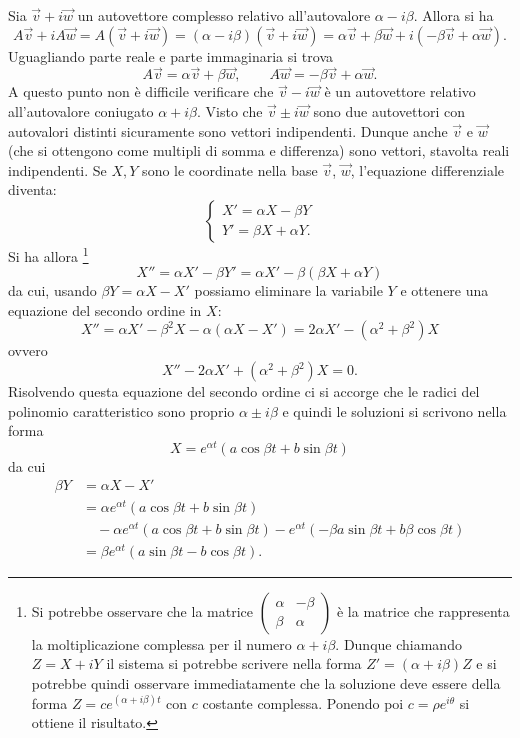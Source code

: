 Sia $\vec v + i \vec w$ un autovettore complesso relativo
all'autovalore $\alpha - i \beta$.
Allora si ha
\[
 A\vec v + i A \vec w
 = A(\vec v + i \vec w)
 = (\alpha - i \beta)(\vec v + i \vec w)
 = \alpha \vec v + \beta \vec w +i(-\beta \vec v + \alpha \vec w).
\]
Uguagliando parte reale e parte immaginaria si trova
\[
  A \vec v = \alpha \vec v + \beta \vec w,
  \qquad
  A \vec w = -\beta \vec v + \alpha \vec w.
\]
A questo punto non è difficile verificare che $\vec v - i \vec w$
è un autovettore relativo all'autovalore coniugato $\alpha + i\beta$.
Visto che $\vec v\pm i\vec w$ sono due autovettori con autovalori
distinti sicuramente sono vettori indipendenti.
Dunque anche $\vec v$ e $\vec w$
(che si ottengono come multipli di somma e differenza)
sono vettori, stavolta reali
indipendenti.
Se $X,Y$ sono le coordinate nella base $\vec v$, $\vec w$, l'equazione
differenziale diventa:
\[
\begin{cases}
 X' = \alpha X - \beta Y \\
 Y' = \beta X + \alpha Y.
\end{cases}
\]
Si ha allora%
\footnote{Si potrebbe osservare che la matrice
$\begin{pmatrix}\alpha&-\beta\\ \beta & \alpha\end{pmatrix}$
è la matrice che rappresenta la moltiplicazione
complessa per il numero $\alpha + i\beta$. Dunque chiamando $Z=X+iY$
il sistema si potrebbe scrivere nella forma $Z'=(\alpha +i\beta)Z$
e si potrebbe quindi osservare immediatamente
che la soluzione deve essere della forma $Z = c e^{(\alpha+i\beta)t}$
con $c$ costante complessa. Ponendo poi $c=\rho e^{i\theta}$
si ottiene il risultato.}
\[
 X'' = \alpha X' - \beta Y'
 = \alpha X' - \beta (\beta X + \alpha Y)
\]
da cui, usando $\beta Y = \alpha X - X'$ possiamo eliminare la variabile $Y$
e ottenere una equazione del secondo ordine in $X$:
\[
 X'' = \alpha X' - \beta^2 X - \alpha (\alpha X - X')
  = 2 \alpha X' - (\alpha^2+\beta^2) X
\]
ovvero
\[
 X'' - 2 \alpha X' + (\alpha^2 + \beta^2) X = 0.
\]
Risolvendo questa equazione del secondo ordine ci si accorge
che le radici del polinomio caratteristico sono proprio $\alpha \pm i \beta$
e quindi le soluzioni si scrivono nella forma
\[
X = e^{\alpha t}(a \cos \beta t + b \sin \beta t)
\]
da cui
\begin{align*}
\beta Y
&= \alpha X - X'\\
& = \alpha e^{\alpha t}(a \cos \beta t + b \sin \beta t) \\
&\quad - \alpha e^{\alpha t}(a\cos \beta t + b \sin \beta t)
  - e^{\alpha t}(-\beta a \sin \beta t + b \beta \cos \beta t) \\
 &= \beta e^{\alpha t}(a\sin \beta t - b \cos \beta t).
\end{align*}
